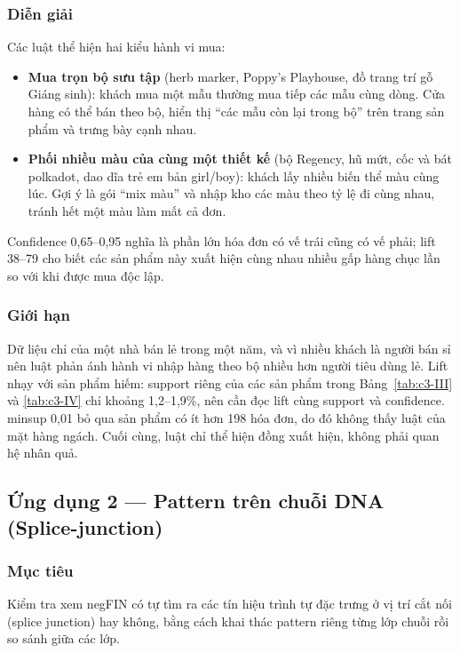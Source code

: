 \subsubsection{Diễn giải}

Các luật thể hiện hai kiểu hành vi mua:

\begin{itemize}
\tightlist
\item
  \textbf{Mua trọn bộ sưu tập} (herb marker, Poppy's Playhouse, đồ trang trí gỗ Giáng sinh): khách mua một mẫu thường mua tiếp các mẫu cùng dòng. Cửa hàng có thể bán theo bộ, hiển thị ``các mẫu còn lại trong bộ'' trên trang sản phẩm và trưng bày cạnh nhau.
\item
  \textbf{Phối nhiều màu của cùng một thiết kế} (bộ Regency, hũ mứt, cốc và bát polkadot, dao dĩa trẻ em bản girl/boy): khách lấy nhiều biến thể màu cùng lúc. Gợi ý là gói ``mix màu'' và nhập kho các màu theo tỷ lệ đi cùng nhau, tránh hết một màu làm mất cả đơn.
\end{itemize}

Confidence 0,65--0,95 nghĩa là phần lớn hóa đơn có vế trái cũng có vế phải; lift 38--79 cho biết các sản phẩm này xuất hiện cùng nhau nhiều gấp hàng chục lần so với khi được mua độc lập.

\subsubsection{Giới hạn}

Dữ liệu chỉ của một nhà bán lẻ trong một năm, và vì nhiều khách là người bán sỉ nên luật phản ánh hành vi nhập hàng theo bộ nhiều hơn người tiêu dùng lẻ. Lift nhạy với sản phẩm hiếm: support riêng của các sản phẩm trong Bảng~\ref{tab:c3-III} và \ref{tab:c3-IV} chỉ khoảng 1,2--1,9\%, nên cần đọc lift cùng support và confidence. minsup 0,01 bỏ qua sản phẩm có ít hơn 198 hóa đơn, do đó không thấy luật của mặt hàng ngách. Cuối cùng, luật chỉ thể hiện đồng xuất hiện, không phải quan hệ nhân quả.

\subsection{Ứng dụng 2 --- Pattern trên chuỗi DNA (Splice-junction)}

\subsubsection{Mục tiêu}

Kiểm tra xem negFIN có tự tìm ra các tín hiệu trình tự đặc trưng ở vị trí cắt nối (splice junction) hay không, bằng cách khai thác pattern riêng từng lớp chuỗi rồi so sánh giữa các lớp.

